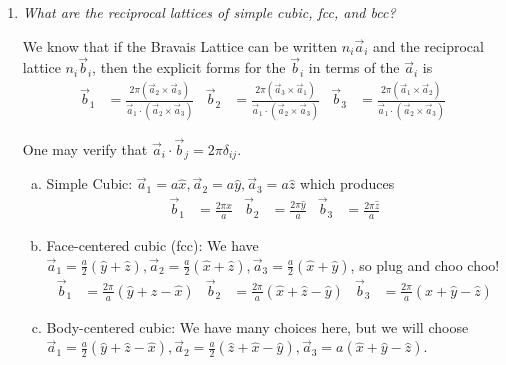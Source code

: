 \documentclass[10pt]{report}
\begin{document}
\begin{enumerate}[1.]
    \item \emph{What are the reciprocal lattices of simple cubic, fcc, and bcc?}

        We know that if the Bravais Lattice can be written $n_i\vec{a}_i$ and the reciprocal lattice $n_i\vec{b}_i$, then the explicit forms for the $\vec{b}_i$ in terms of the $\vec{a}_i$ is
        \begin{align}
            \vec{b}_1 &= \frac{2\pi\left( \vec{a}_2 \times \vec{a}_3 \right)}{\vec{a}_1 \cdot \left( \vec{a}_2 \times \vec{a}_3 \right)}&
            \vec{b}_2 &= \frac{2\pi\left( \vec{a}_3 \times \vec{a}_1 \right)}{\vec{a}_1 \cdot \left( \vec{a}_2 \times \vec{a}_3 \right)}&
            \vec{b}_3 &= \frac{2\pi\left( \vec{a}_1 \times \vec{a}_2 \right)}{\vec{a}_1 \cdot \left( \vec{a}_2 \times \vec{a}_3 \right)}
        \end{align}
        
        One may verify that $\vec{a}_i \cdot \vec{b}_j = 2\pi \delta_{ij}$. 

        \begin{enumerate}[a)]
            \item Simple Cubic: $\vec{a}_1 = a\hat{x}, \vec{a}_2 = a\hat{y}, \vec{a}_3 = a\hat{z}$ which produces
                \begin{align}
                    \vec{b}_1 &= \frac{2\pi \hat{x}}{a}&
                    \vec{b}_2 &= \frac{2\pi \hat{y}}{a}&
                    \vec{b}_3 &= \frac{2\pi \hat{z}}{a}
                \end{align}
            \item Face-centered cubic (fcc): We have $\vec{a}_1 = \frac{a}{2}\left( \hat{y} + \hat{z} \right), \vec{a}_2 = \frac{a}{2}\left( \hat{x} + \hat{z} \right), \vec{a}_3 = \frac{a}{2}\left( \hat{x} + \hat{y} \right)$, so plug and choo choo!
                \begin{align}
                    \vec{b}_1 &= \frac{2\pi}{a}\left( \hat{y} + \hat{z}  - \hat{x}\right)&
                    \vec{b}_2 &= \frac{2\pi}{a}\left( \hat{x} + \hat{z}  - \hat{y}\right)&
                    \vec{b}_3 &= \frac{2\pi}{a}\left( \hat{x} + \hat{y}  - \hat{z}\right)
                \end{align}
            \item Body-centered cubic: We have many choices here, but we will choose $\vec{a}_1 = \frac{a}{2}\left( \hat{y} + \hat{z} - \hat{x} \right), \vec{a}_2 = \frac{a}{2}\left( \hat{z} + \hat{x} - \hat{y} \right), \vec{a}_3 = a\left( \hat{x} + \hat{y} - \hat{z} \right)$. 
                

\end{enumerate}
\end{enumerate}
\end{document}

